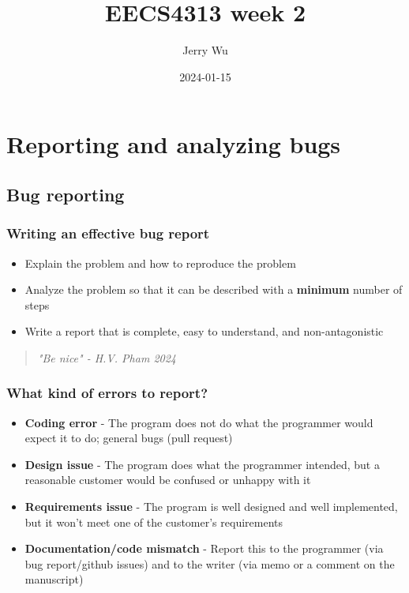 \documentclass[12pt]{book}
\title{EECS4313 week 2}
\author{Jerry Wu}
\date{2024-01-15}
\begin{document}
\maketitle
\tableofcontents

\chapter{Reporting and analyzing bugs}

\section*{Bug reporting}
\subsection*{Writing an effective bug report}
\begin{itemize}
    \item Explain the problem and how to reproduce the problem
    \item Analyze the problem so that it can be described with a \textbf{minimum} number of steps
    \item Write a report that is complete, easy to understand, and non-antagonistic
\end{itemize}

\begin{quote}
    \textit{"Be nice" - H.V. Pham 2024}
\end{quote}

\subsection*{What kind of errors to report?}

\begin{itemize}
    \item \textbf{Coding error} - The program does not do what the programmer would expect it to do; general bugs (pull request)
    
    \item \textbf{Design issue} - The program does what the programmer intended, but a reasonable customer would be confused or unhappy with it
    
    \item \textbf{Requirements issue} - The program is well designed and well implemented, but it won't meet one of the customer's requirements
    
    \item \textbf{Documentation/code mismatch} - Report this to the programmer (via bug report/github issues) and to the writer (via memo or a comment on the manuscript)
\end{itemize}
\end{document}

